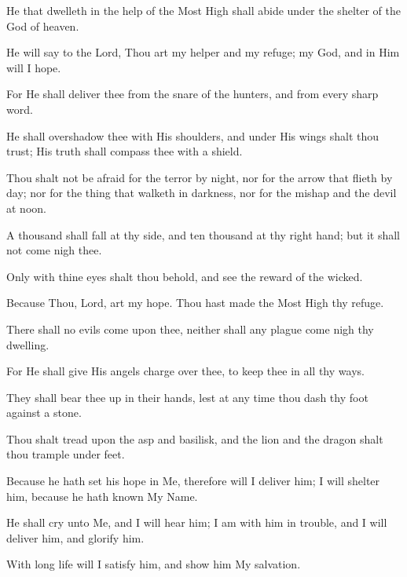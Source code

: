 He that dwelleth in the help of the Most High shall abide under the shelter of the God of heaven.

He will say to the Lord, Thou art my helper and my refuge; my God, and in Him will I hope.

For He shall deliver thee from the snare of the hunters, and from every sharp word.

He shall overshadow thee with His shoulders, and under His wings shalt thou trust; His truth shall compass thee with a shield.

Thou shalt not be afraid for the terror by night, nor for the arrow that flieth by day; nor for the thing that walketh in darkness, nor for the mishap and the devil at noon.

A thousand shall fall at thy side, and ten thousand at thy right hand; but it shall not come nigh thee.

Only with thine eyes shalt thou behold, and see the reward of the wicked.

Because Thou, Lord, art my hope. Thou hast made the Most High thy refuge.

There shall no evils come upon thee, neither shall any plague come nigh thy dwelling.

For He shall give His angels charge over thee, to keep thee in all thy ways.

They shall bear thee up in their hands, lest at any time thou dash thy foot against a stone.

Thou shalt tread upon the asp and basilisk, and the lion and the dragon shalt thou trample under feet.

Because he hath set his hope in Me, therefore will I deliver him; I will shelter him, because he hath known My Name.

He shall cry unto Me, and I will hear him; I am with him in trouble, and I will deliver him, and glorify him.

With long life will I satisfy him, and show him My salvation.
